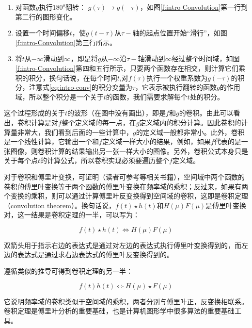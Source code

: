 \begin{enumerate}
	\item 对函数$g$执行$180^{o}$翻转： $g(\tau )\to g(-\tau )$，如图\ref{f:intro-Convolution}第一行到第二行的图形变化。
	\item 设置一个时间偏移$t$，使$g(t-\tau )$从$\tau-$轴的起点位置开始“滑行”，如图\ref{f:intro-Convolution}第三行所示。
	\item 将$t$从$-\infty$滑动到$\infty$，即是将$g$从$-\infty$沿$\tau-$轴滑动到$\infty$经过整个时间域，如图\ref{f:intro-Convolution}第四和五行所示，只要两个函数存在相交，则计算它们乘积的积分，换句话说，在每个时间$t$,对$f(\tau )$执行一个权重系数为$g(-\tau )$的积分，注意式\ref{eq:intro-conv}的积分变量为$\tau$，它表示被执行翻转的函数$g$的作用域，所以整个积分是一个关于$t$的函数，我们需要求解每个$t$处的积分。
\end{enumerate}

这个过程形成的关于$t$的波形（在图中没有画出），即是$f$和$g$的卷积。由此可以看出，卷积计算是对$f$整个定义域的每一点，在$g$定义域内的积分计算。因此卷积的计算量非常大，我们看到后面的一些计算中，$g$的定义域一般都非常小。此外，卷积是一个线性计算，它输出一个和$f$定义域一样大小的结果，例如，如果$f$代表的是一张图像，则卷积计算的结果输出另一张一样大小的图像。另外，卷积公式本身只是关于每个点$t$的计算公式，所以卷积实现必须要遍历整个$f$定义域。

对于卷积和傅里叶变换，可证明（读者可参考\cite{b:DigitalImageProcessing}等相关书籍），空间域中两个函数的卷积的傅里叶变换等于两个函数的傅里叶变换在频率域的乘积；反过来，如果有两个变换的乘积，则可以通过计算傅里叶反变换得到空间域的卷积，这即是卷积定理（convolution theorem）。换句话说，$f(t)\star h(t)$和$H(\mu)F(\mu)$是傅里叶变换对，这一结果是卷积定理的一半，可以写为：

\begin{equation}
	f(t)\star h(t)\Leftrightarrow H(\mu)F(\mu)
\end{equation}

双箭头用于指示右边的表达式是通过对左边的表达式执行傅里叶变换得到的，而左边的表达式是通过求右边表达式的傅里叶反变换得到的。

遵循类似的推导可得到卷积定理的另一半：

\begin{equation}
	f(t)h(t)\Leftrightarrow H(\mu)\star F(\mu)
\end{equation}

\noindent 它说明频率域的卷积类似于空间域的乘积，两者分别与傅里叶正，反变换相联系。卷积定理是傅里叶分析的重要基础，也是计算机图形学中很多算法的重要基础工具。



